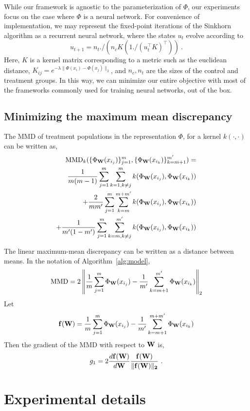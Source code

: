 \documentclass{article}
\begin{document}
While our framework is agnostic to the parameterization of $\Phi$, our experiments focus on the case where $\Phi$ is a neural network. For convenience of implementation, we may represent the fixed-point iterations of the Sinkhorn algorithm as a recurrent neural network, where the states $u_t$ evolve according to
$$
u_{t+1} = n_t ./ (n_c K (1./(u_t^\top K)^\top))~.
$$
Here, $K$ is a kernel matrix corresponding to a metric such as the euclidean distance, $K_{ij} = e^{-\lambda\|\Phi(x_i) - \Phi(x_j)\|_2}$, and $n_c, n_t$ are the sizes of the control and treatment groups. In this way, we can minimize our entire objective with most of the frameworks commonly used for training neural networks, out of the box.

\subsection{Minimizing the maximum mean discrepancy}

The MMD of treatment populations in the representation $\Phi$, for a kernel $k(\cdot,\cdot)$ can be written as,
\begin{align}
\text{MMD}_k(\{\Phi_{\bf{W}}(x_{i_j})\}_{j=1}^m, \{\Phi_{\bf{W}}(x_{i_{k}})\}_{k=m+1}^{m'} ) = \\
\frac{1}{m(m-1)}\sum_{j=1}^m \sum_{k=1,k\neq j}^{m} k(\Phi_{\bf{W}}(x_{i_j}), \Phi_{\bf{W}}(x_{i_k})) \\
+ \frac{2}{mm'}\sum_{j=1}^m \sum_{k=m}^{m+m'} k(\Phi_{\bf{W}}(x_{i_j}), \Phi_{\bf{W}}(x_{i_k})) \\
+ \frac{1}{m'(1-m')}\sum_{j=1}^m \sum_{k=m,k\neq j}^{m'} k(\Phi_{\bf{W}}(x_{i_j}), \Phi_{\bf{W}}(x_{i_k}))
\end{align}




The linear maximum-mean discrepancy can be written as a distance between means. In the notation of Algorithm~\ref{alg:model},
$$
\text{MMD} = 2\left\| \frac{1}{m}\sum_{j=1}^m \Phi_{\bf{W}}(x_{i_j}) -\frac{1}{m'}\sum_{k=m+1}^{m'} \Phi_{\bf{W}}(x_{i_k})\right\|_2
$$
Let
$$
{\bf f}({\bf W}) = \frac{1}{m}\sum_{j=1}^m \Phi_{\bf{W}}(x_{i_j}) - \frac{1}{m'}\sum_{k=m+1}^{m+m'} \Phi_{\bf{W}}(x_{i_k})
$$
Then the gradient of the MMD with respect to $\bf{W}$ is,
$$
g_1 = 2 \frac{d \bf{f}(\bf{W})}{d\bf{W}} \frac{\bf{f}(\bf{W})}{\|\bf{f}(\bf{W})\|_2} ~.
$$

 \section{Experimental details}\label{sec:appexp}
\end{document}
